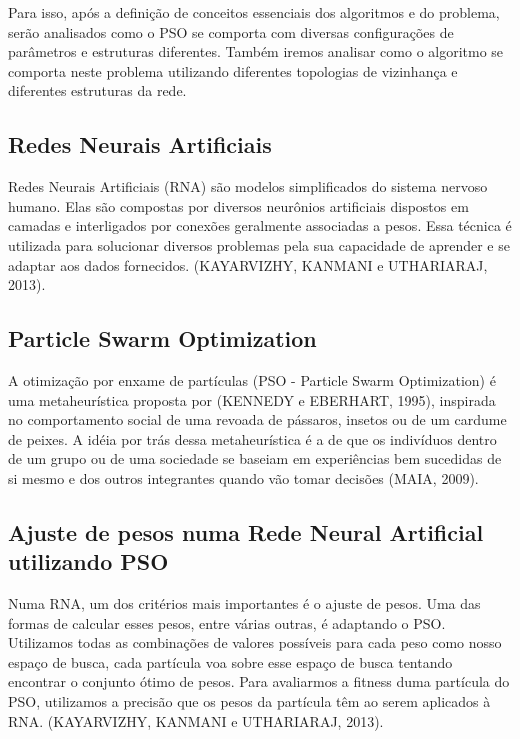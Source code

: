 \documentclass[a4paper,12pt]{article}
\begin{document}
    Para isso, após a definição de conceitos essenciais dos algoritmos e do problema, serão 
    analisados como o PSO se comporta com diversas configurações de parâmetros e estruturas 
    diferentes. Também iremos analisar como o algoritmo se comporta neste problema utilizando 
    diferentes topologias de vizinhança e diferentes estruturas da rede.

   \subsection{Redes Neurais Artificiais}
      Redes Neurais Artificiais (RNA) são modelos simplificados do sistema nervoso humano. 
      Elas são compostas por diversos neurônios artificiais dispostos em camadas e interligados 
      por conexões geralmente associadas a pesos. Essa técnica é utilizada para solucionar 
      diversos problemas pela sua capacidade de aprender e se adaptar aos dados fornecidos. 
      (KAYARVIZHY, KANMANI e UTHARIARAJ, 2013).

    \subsection{Particle Swarm Optimization}
      A otimização por enxame de partículas (PSO - Particle Swarm Optimization) é uma 
      metaheurística proposta por (KENNEDY e EBERHART, 1995), inspirada no comportamento 
      social de uma revoada de pássaros, insetos ou de um cardume de peixes. A idéia por trás 
      dessa metaheurística é a de que os indivíduos dentro de um grupo ou de uma sociedade se 
      baseiam em experiências bem sucedidas de si mesmo e dos outros integrantes quando vão 
      tomar decisões (MAIA, 2009).

    \subsection{Ajuste de pesos numa Rede Neural Artificial utilizando PSO}
      Numa RNA, um dos critérios mais importantes é o ajuste de pesos. Uma das formas de 
      calcular esses pesos, entre várias outras, é adaptando o PSO. Utilizamos todas as 
      combinações de valores possíveis para cada peso como nosso espaço de busca, cada 
      partícula voa sobre esse espaço de busca tentando encontrar o conjunto ótimo de pesos. 
      Para avaliarmos a fitness duma partícula do PSO, utilizamos a precisão que os pesos da 
      partícula têm ao serem aplicados à RNA. (KAYARVIZHY, KANMANI e UTHARIARAJ, 2013).
    
\end{document}
